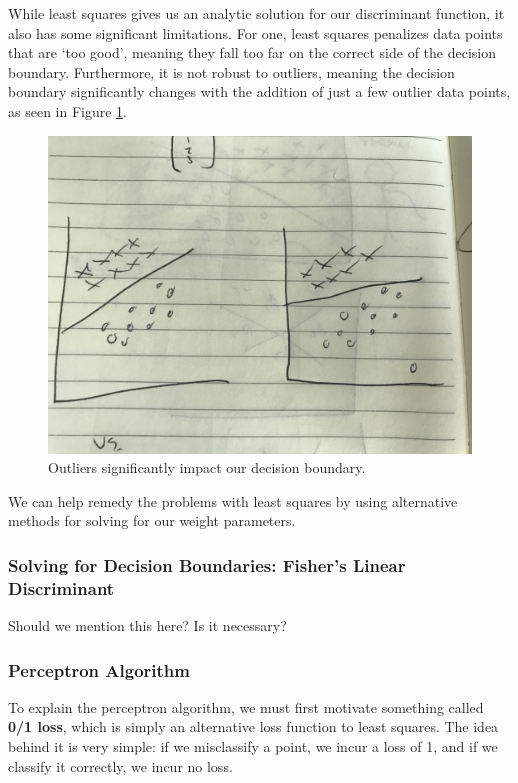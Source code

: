 While least squares gives us an analytic solution for our discriminant function, it also has some significant limitations. For one, least squares penalizes data points that are `too good', meaning they fall too far on the correct side of the decision boundary. Furthermore, it is not robust to outliers, meaning the decision boundary significantly changes with the addition of just a few outlier data points, as seen in Figure \ref{fig:outlier-phenomenon}.

\begin{figure}
    \centering
    \includegraphics[width=0.5\paperwidth]{../Classification/fig/outlier_phenomenon.jpg}
    \caption{Outliers significantly impact our decision boundary.}
    \label{fig:outlier-phenomenon}
\end{figure}

We can help remedy the problems with least squares by using alternative methods for solving for our weight parameters.

\subsubsection{Solving for Decision Boundaries: Fisher's Linear Discriminant}
Should we mention this here? Is it necessary?

\subsubsection{Perceptron Algorithm}
To explain the perceptron algorithm, we must first motivate something called \textbf{0/1 loss}, which is simply an alternative loss function to least squares. The idea behind it is very simple: if we misclassify a point, we incur a loss of 1, and if we classify it correctly, we incur no loss.

